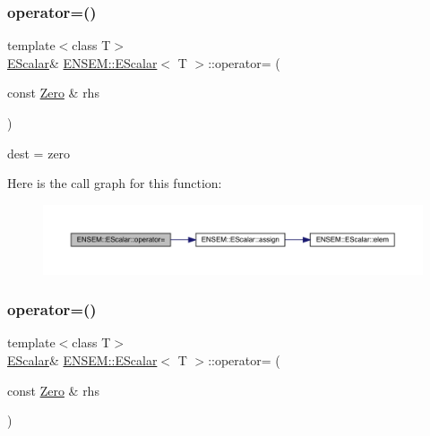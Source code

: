 \subsubsection{\texorpdfstring{operator=()}{operator=()}\hspace{0.1cm}{\footnotesize\ttfamily [3/8]}}
{\footnotesize\ttfamily template$<$class T$>$ \\
\mbox{\hyperlink{classENSEM_1_1EScalar}{E\+Scalar}}\& \mbox{\hyperlink{classENSEM_1_1EScalar}{E\+N\+S\+E\+M\+::\+E\+Scalar}}$<$ T $>$\+::operator= (\begin{DoxyParamCaption}\item[{const \mbox{\hyperlink{structENSEM_1_1Zero}{Zero}} \&}]{rhs }\end{DoxyParamCaption})\hspace{0.3cm}{\ttfamily [inline]}}



dest = zero 

Here is the call graph for this function\+:
\nopagebreak
\begin{figure}[H]
\begin{center}
\leavevmode
\includegraphics[width=350pt]{d0/d82/classENSEM_1_1EScalar_a9619fd24baf50fd03986c3056a484cb9_cgraph}
\end{center}
\end{figure}
\mbox{\label{classENSEM_1_1EScalar_a9619fd24baf50fd03986c3056a484cb9}} 
\subsubsection{\texorpdfstring{operator=()}{operator=()}\hspace{0.1cm}{\footnotesize\ttfamily [4/8]}}
{\footnotesize\ttfamily template$<$class T$>$ \\
\mbox{\hyperlink{classENSEM_1_1EScalar}{E\+Scalar}}\& \mbox{\hyperlink{classENSEM_1_1EScalar}{E\+N\+S\+E\+M\+::\+E\+Scalar}}$<$ T $>$\+::operator= (\begin{DoxyParamCaption}\item[{const \mbox{\hyperlink{structENSEM_1_1Zero}{Zero}} \&}]{rhs }\end{DoxyParamCaption})\hspace{0.3cm}{\ttfamily [inline]}}



